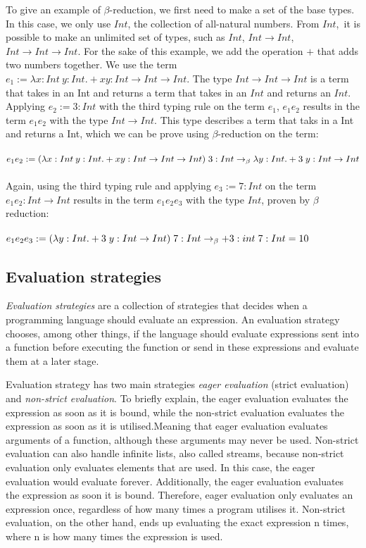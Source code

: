 \para
To give an example of $\beta$-reduction, we first need to make a set of the base types. In this case, we only use $Int$, the collection of all-natural numbers. From $Int$, it is possible to make an unlimited set of types, such as $Int$, $Int \rightarrow Int$, $Int \rightarrow Int \rightarrow Int$. For the sake of this example, we add the operation $+$ that adds two numbers together. We use the term $e_1:= \lambda x:Int\: y:Int. + x y:Int \rightarrow Int \rightarrow Int$. The type $Int \rightarrow Int \rightarrow Int$ is a term that takes in an Int and returns a term that takes in an $Int$ and returns an $Int$. Applying $e_2 := 3:Int$ with the third typing rule on the term $e_1$, $e_1 e_2$ results in the term $e_1 e_2$ with the type $Int \rightarrow Int$. This type describes a term that taks in a Int and returns a Int, which we can be prove using $\beta$-reduction on the term:
\\ \\
$e_1 e_2 := (\lambda x:Int\: y:Int. + x y:Int \rightarrow Int \rightarrow Int)\; 3:Int 
\newline\rightarrow_\beta \lambda y:Int. + 3\; y: Int \rightarrow Int$
\\ \\
Again, using the third typing rule and applying $e_3 := 7:Int$ on the term $e_1 e_2:Int \rightarrow Int$ results in the term $e_1 e_2 e_3$ with the type $Int$, proven by $\beta$ reduction: 
\\ \\
$e_1 e_2 e_3 := (\lambda y:Int. + 3\; y: Int \rightarrow Int) \; 7:Int
\newline \rightarrow_\beta + 3:int \; 7:Int = 10$

\subsection{Evaluation strategies}
\emph{Evaluation strategies} are a collection of strategies that decides when a programming language should evaluate an expression. An evaluation strategy chooses, among other things, if the language should evaluate expressions sent into a function before executing the function or send in these expressions and evaluate them at a later stage.

\para
Evaluation strategy has two main strategies \emph{eager evaluation} (strict evaluation) and \emph{non-strict evaluation}. To briefly explain, the eager evaluation evaluates the expression as soon as it is bound, while the non-strict evaluation evaluates the expression as soon as it is utilised.Meaning that eager evaluation evaluates arguments of a function, although these arguments may never be used. Non-strict evaluation can also handle infinite lists, also called streams, because non-strict evaluation only evaluates elements that are used. In this case, the eager evaluation would evaluate forever. Additionally, the eager evaluation evaluates the expression as soon it is bound. Therefore, eager evaluation only evaluates an expression once, regardless of how many times a program utilises it. Non-strict evaluation, on the other hand, ends up evaluating the exact expression n times, where n is how many times the expression is used.

